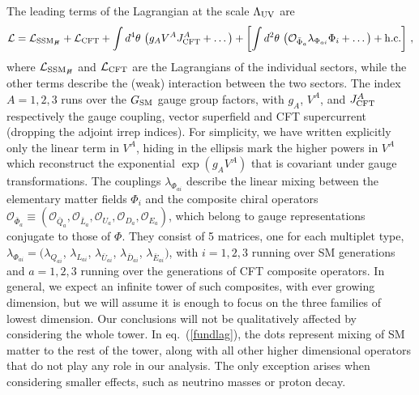 \documentclass[a4paper,12pt]{article}
\newcommand{\hc}{{\rm h.c.}}
\newcommand{\beq}{\begin{equation}}
\newcommand{\eeq}{\end{equation}}
\def\eq#1{eq.~(\ref{#1})}
\def\eq#1{eq.~(\ref{#1})}
\def\O{\mathcal{O}}
\def\LUV{\Lambda_{\rm UV}}
\def\SSMnH{{\rm SSM}_{H \!\!\!\!\!\not\,\,\,\,\,}}
\begin{document}
The leading terms of the Lagrangian at the scale $\LUV$ are
\beq
{\cal L} = {\cal L}_{\SSMnH} +{\cal L}_{\rm CFT} + \int d^4 \theta \, \left( g_A V^A J^A_{\rm CFT} + \dots \right) +
\left[ \int d^2 \theta \, \left( {\O}_{{\bar \Phi}_a} \lambda_{\Phi_{ai}} \Phi_i   + \dots \right) +\hc \right] \, ,
\label{fundlag}
\eeq 
where ${\cal L}_{\SSMnH}$ and ${\cal L}_{\rm CFT}$ are the Lagrangians of the individual sectors, while the other terms describe the (weak) interaction between the two sectors. 
The index $A=1,2,3$ runs over the $G_{\rm SM}$ gauge group factors, with $g_A$, $V^A$,  and $J^A_{\rm CFT}$ respectively  the gauge coupling, vector superfield  and  CFT supercurrent (dropping the adjoint irrep indices). For simplicity, we have written explicitly only the linear term in $V^A$, hiding in the ellipsis mark the higher powers in $V^A$ which reconstruct the exponential $\exp(g_A V^A)$ that is covariant under gauge transformations.  The couplings $\lambda_{\Phi_{ai}}$ describe the linear mixing between the elementary matter fields $\Phi_i$ and the composite chiral operators $\O_{{\bar \Phi}_a}\equiv (\O_{{\bar Q}_a}, \O_{{\bar L}_a},\O_{{U}_a},\O_{{D}_a}, \O_{{E}_a})$, which belong to gauge representations conjugate to those of $\Phi$. They consist of 5 matrices, one for each multiplet type, $\lambda_{\Phi_{ai}}=(\lambda_{{Q}_{ai}}$, $\lambda_{{L}_{ai}}$, $\lambda_{{\bar U}_{ai}}$, $\lambda_{{\bar D}_{ai}}$, $\lambda_{{\bar E}_{ai}})$, with $i=1,2,3$ running over SM generations and $a=1,2,3$ running over the generations of CFT composite operators.
 In general, we expect an infinite  tower of such composites, with ever growing dimension, but we will assume it is enough to focus on the three families of lowest dimension. Our conclusions will not be qualitatively affected by considering the whole tower. 
 In \eq{fundlag}, the dots represent mixing of  SM matter to  the rest of the tower, along with all other higher dimensional operators that do not play any role in our analysis.  The only exception arises when considering smaller effects, such as neutrino masses or proton decay.
 
\end{document}
